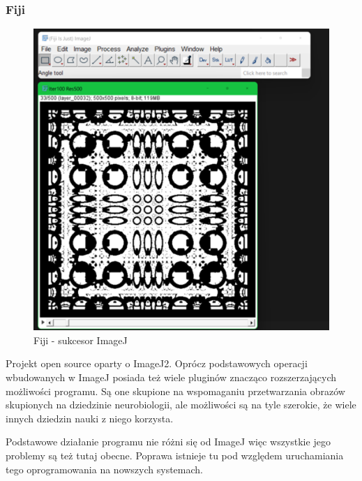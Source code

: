 \subsubsection{Fiji}
\begin{figure}[H]
    \centering
    \includegraphics[width=0.8\linewidth]{./images/Picture4.png}
    \caption{Fiji - sukcesor ImageJ}
    \label{fig:fiji}
\end{figure}
Projekt open source oparty o ImageJ2. Oprócz podstawowych operacji wbudowanych w ImageJ posiada też wiele pluginów znacząco rozszerzających możliwości programu. Są one skupione na wspomaganiu przetwarzania obrazów skupionych na dziedzinie neurobiologii, ale możliwości są na tyle szerokie, że wiele innych dziedzin nauki z niego korzysta.

Podstawowe działanie programu nie różni się od ImageJ więc wszystkie jego problemy są też tutaj obecne. Poprawa istnieje tu pod względem uruchamiania tego oprogramowania na nowszych systemach.

